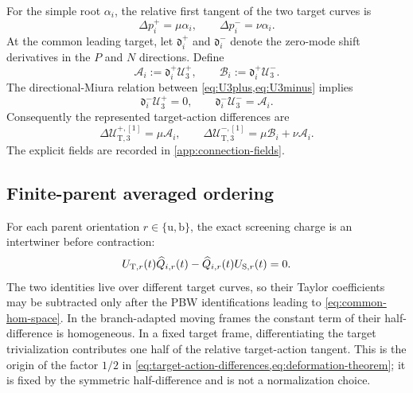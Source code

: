 \documentclass[11pt,a4paper]{article}
\numberwithin{equation}{section}
\theoremstyle{remark}
\newcommand{\T}{\mathrm{T}}
\newcommand{\cU}{\mathcal U}
\newcommand{\cA}{\mathcal A}
\newcommand{\cB}{\mathcal B}
\begin{document}
For the simple root $\alpha_i$, the relative first tangent of the two target curves is
\begin{equation}
 \Delta p_i^+=\mu\alpha_i,\qquad
 \Delta p_i^-=\nu\alpha_i.
 \label{eq:root-target-tangent}
\end{equation}
At the common leading target, let $\mathfrak d_i^+$ and $\mathfrak d_i^-$ denote the zero-mode
shift derivatives in the $P$ and $N$ directions.  Define
\begin{equation}
 \cA_i:=\mathfrak d_i^+\cU_3^+,\qquad
 \cB_i:=\mathfrak d_i^+\cU_3^-.
 \label{eq:connection-fields}
\end{equation}
The directional-Miura relation between \cref{eq:U3plus,eq:U3minus} implies
\begin{equation}
 \mathfrak d_i^-\cU_3^+=0,\qquad
 \mathfrak d_i^-\cU_3^-=\cA_i.
 \label{eq:structural-derivative}
\end{equation}
Consequently the represented target-action differences are
\begin{equation}
 \Delta\cU_{\T,3}^{+,[1]}=\mu\cA_i,\qquad
 \Delta\cU_{\T,3}^{-,[1]}=\mu\cB_i+\nu\cA_i.
 \label{eq:target-action-differences}
\end{equation}
The explicit fields are recorded in \cref{app:connection-fields}.

\subsection{Finite-parent averaged ordering}

For each parent orientation $r\in\{\mathrm u,\mathrm b\}$, the exact screening charge is an
intertwiner before contraction:
\begin{equation}
 U_{{\rm T},r}(t)\widehat Q_{i,r}(t)
 -\widehat Q_{i,r}(t)U_{{\rm S},r}(t)=0.
 \label{eq:exact-parent-intertwiner}
\end{equation}
The two identities live over different target curves, so their Taylor coefficients may be
subtracted only after the PBW identifications leading to \cref{eq:common-hom-space}.  In the
branch-adapted moving frames the constant term of their half-difference is homogeneous.  In a
fixed target frame, differentiating the target trivialization contributes one half of the relative
target-action tangent.  This is the origin of the factor $1/2$ in
\cref{eq:target-action-differences,eq:deformation-theorem}; it is fixed by the symmetric
half-difference and is not a normalization choice.
\end{document}
